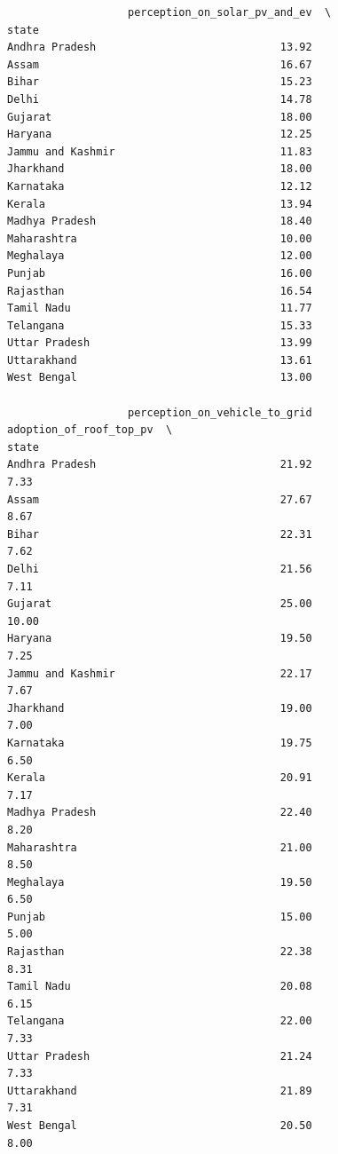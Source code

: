 \documentclass[
  letterpaper,
  DIV=11,
  numbers=noendperiod]{scrartcl}
\begin{document}
\begin{verbatim}
                   perception_on_solar_pv_and_ev  \
state                                              
Andhra Pradesh                             13.92   
Assam                                      16.67   
Bihar                                      15.23   
Delhi                                      14.78   
Gujarat                                    18.00   
Haryana                                    12.25   
Jammu and Kashmir                          11.83   
Jharkhand                                  18.00   
Karnataka                                  12.12   
Kerala                                     13.94   
Madhya Pradesh                             18.40   
Maharashtra                                10.00   
Meghalaya                                  12.00   
Punjab                                     16.00   
Rajasthan                                  16.54   
Tamil Nadu                                 11.77   
Telangana                                  15.33   
Uttar Pradesh                              13.99   
Uttarakhand                                13.61   
West Bengal                                13.00   

                   perception_on_vehicle_to_grid  adoption_of_roof_top_pv  \
state                                                                       
Andhra Pradesh                             21.92                     7.33   
Assam                                      27.67                     8.67   
Bihar                                      22.31                     7.62   
Delhi                                      21.56                     7.11   
Gujarat                                    25.00                    10.00   
Haryana                                    19.50                     7.25   
Jammu and Kashmir                          22.17                     7.67   
Jharkhand                                  19.00                     7.00   
Karnataka                                  19.75                     6.50   
Kerala                                     20.91                     7.17   
Madhya Pradesh                             22.40                     8.20   
Maharashtra                                21.00                     8.50   
Meghalaya                                  19.50                     6.50   
Punjab                                     15.00                     5.00   
Rajasthan                                  22.38                     8.31   
Tamil Nadu                                 20.08                     6.15   
Telangana                                  22.00                     7.33   
Uttar Pradesh                              21.24                     7.33   
Uttarakhand                                21.89                     7.31   
West Bengal                                20.50                     8.00   


\end{verbatim}
\end{document}
